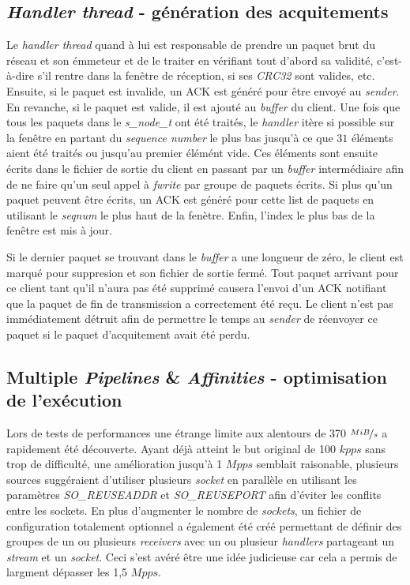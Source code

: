 \documentclass[../main.tex]{subfiles}
\begin{document}
\subsection{\textit{Handler thread} - génération des acquitements}
\label{sec:handler}

Le \textit{handler thread} quand à lui est responsable de prendre un paquet brut du réseau et son émmeteur et de le traiter en vérifiant tout
d'abord sa validité, c'est-à-dire s'il rentre dans la fenêtre de réception, si ses \textit{CRC32} sont valides, etc. Ensuite, si le paquet
est invalide, un ACK est généré pour être envoyé au \textit{sender}. En revanche, si le paquet est valide, il est ajouté au \textit{buffer}
du client. Une fois que tous les paquets dans le \textit{s\_node\_t} ont été traités, le \textit{handler} itère si possible sur la fenêtre en partant
du \textit{sequence number} le plus bas jusqu'à ce que $31$ éléments aient été traités ou jusqu'au premier élémént vide. Ces éléments sont ensuite
écrits dans le fichier de sortie du client en passant par un \textit{buffer} intermédiaire afin de ne faire qu'un seul appel à \textit{fwrite}
par groupe de paquets écrits. Si plus qu'un paquet peuvent être écrits, un ACK est généré pour cette list de paquets en utilisant le \textit{seqnum}
le plus haut de la fenètre. Enfin, l'index le plus bas de la fenêtre est mis à jour.


Si le dernier paquet se trouvant dans le \textit{buffer} a une longueur de zéro, le client est marqué pour suppresion et son fichier de sortie
fermé. Tout paquet arrivant pour ce client tant qu'il n'aura pas été supprimé causera l'envoi d'un ACK notifiant que la paquet de fin de transmission
a correctement été reçu. Le client n'est pas immédiatement détruit afin de permettre le temps au \textit{sender} de réenvoyer ce paquet si le
paquet d'acquitement avait été perdu.

\subsection{Multiple \textit{Pipelines} \& \textit{Affinities} - optimisation de l'exécution}
\label{sec:pipelines}

Lors de tests de performances une étrange limite aux alentours de 370 $\nicefrac{MiB}{s}$ a rapidement été découverte. Ayant déjà atteint
le but original de 100 $kpps$ sans trop de difficulté, une amélioration jusqu'à 1 $Mpps$ semblait raisonable, plusieurs sources\cite{that_awesome_paper,1mmps_article}
suggéraient d'utiliser plusieurs \textit{socket} en parallèle en utilisant les paramètres \textit{SO\_REUSEADDR} et \textit{SO\_REUSEPORT} afin d'éviter
les conflits entre les sockets. En plus d'augmenter le nombre de \textit{sockets}, un fichier de configuration totalement optionnel a également été créé
permettant de définir des groupes de un ou plusieurs \textit{receivers} avec un ou plusieur \textit{handlers} partageant un \textit{stream} et un \textit{socket}.
Ceci s'est avéré être une idée judicieuse car cela a permis de largment dépasser les 1,5 $Mpps$.
\end{document}
